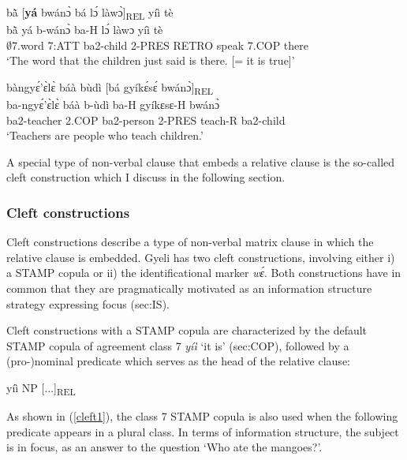 \begin{exe} 
\ex\label{REL2} 
  \glll  bã̀ [{\bfseries yá} bwánɔ̀ bá lɔ́ làwɔ̀]\textsubscript{REL} yíì tè \\
         bã̀ yá b-wánɔ̀ ba-H lɔ́ làwɔ yíì tè \\
         $\emptyset$7.word 7:ATT ba2-child 2-PRES RETRO speak 7.COP there \\
    \trans `The word that the children just said is there. [= it is true]'
\end{exe}


\begin{exe} 
\ex\label{REL2b} 
  \glll  bàngyɛ́'ɛ̀lɛ̀ báà bùdì [bá gyíkɛ́sɛ́ bwánɔ̀]\textsubscript{REL} \\
         ba-ngyɛ́'ɛ̀lɛ̀ báà b-ùdì ba-H gyíkɛsɛ-H bwánɔ̀ \\
         ba2-teacher 2.COP ba2-person 2-PRES teach-R ba2-child \\
    \trans `Teachers are people who teach children.'
\end{exe}

\noindent A special type of non-verbal clause that embeds a relative clause is the so-called cleft construction which I discuss in the following section.









\subsubsection{Cleft constructions}
\label{sec:cleft}

Cleft constructions describe a type of non-verbal matrix clause in which the relative clause is embedded. Gyeli has two cleft constructions, involving either i) a STAMP copula or ii) the identificational marker {\itshape wɛ́}.   Both constructions have in common that they are pragmatically motivated as an information structure strategy expressing focus ({sec:IS}).

Cleft constructions with a STAMP copula are characterized by the default STAMP copula of agreement class 7 {\itshape yíì} `it is' ({sec:COP}), followed by a (pro-)nominal predicate which serves as the head of the relative clause:
\begin{center}
yíì NP [...]\textsubscript{REL}
\end{center}
As shown in (\ref{cleft1}), the class 7 STAMP copula is also used when the following predicate appears in a plural class. In terms of information structure, the subject is in focus, as an answer to the question `Who ate the mangoes?'.

